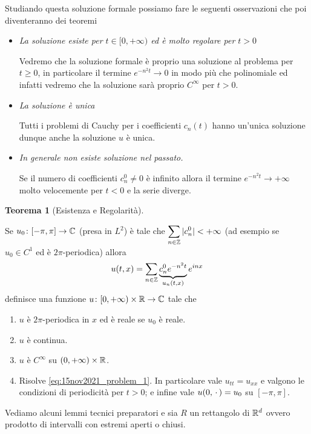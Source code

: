 Studiando questa soluzione formale possiamo fare le seguenti osservazioni che poi diventeranno dei teoremi
\begin{itemize}
	\item \textit{La soluzione esiste per $t \in [0, +\infty)$ ed è molto regolare per $t > 0$}

		Vedremo che la soluzione formale è proprio una soluzione al problema per $t \geq 0$, in particolare il termine $e^{-n^2 t} \to 0$ in modo più che polinomiale ed infatti vedremo che la soluzione sarà proprio $C^\infty$ per $t > 0$.

	\item \textit{La soluzione è unica}

		Tutti i problemi di Cauchy per i coefficienti $c_n(t)$ hanno un'unica soluzione dunque anche la soluzione $u$ è unica.

	\item \textit{In generale non esiste soluzione nel passato.}

		Se il numero di coefficienti $c_n^0 \neq 0$ è infinito allora il termine $e^{-n^2 t} \to +\infty$ molto velocemente per $t < 0$ e la serie diverge.

\end{itemize}

\textbf{Teorema 1} (Esistenza e Regolarità).

Se $u_0 \colon [-\pi, \pi] \to \mathbb C$ (presa in $L^2$) è tale che $\displaystyle \sum_{n \in \mathbb Z} |c_n^0| < +\infty$ (ad esempio se $u_0 \in C^1$ ed è $2\pi$-periodica) allora
$$
u(t, x) = \sum_{n \in \mathbb Z} \underbrace{c_n^0 e^{-n^2 t}}_{u_n(t,x)} e^{inx}
$$
definisce una funzione $u \colon [0, +\infty) \times \mathbb R \to \mathbb C$ tale che
\begin{enumerate}
	\item $u$ è $2\pi$-periodica in $x$ ed è reale se $u_0$ è reale.
	\item $u$ è continua.
	\item $u$ è $C^\infty$ su $(0, +\infty) \times \mathbb R$.
	\item Risolve \eqref{eq:15nov2021_problem_1}. In particolare vale $u_{tt} = u_{xx}$ e valgono le condizioni di periodicità per $t > 0$; e infine vale $u(0, \,\cdot\,) = u_0$ su $[-\pi,\pi]$.
\end{enumerate}

Vediamo alcuni lemmi tecnici preparatori e sia $R$ un rettangolo di $\mathbb R^d$ ovvero prodotto di intervalli con estremi aperti o chiusi.

